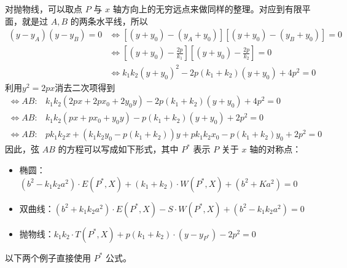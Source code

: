 对抛物线，可以取点 $P$ 与 $x$ 轴方向上的无穷远点来做同样的整理。对应到有限平面，就是过 $A,B$ 的两条水平线，所以
\begin{align*}
(y-y_A)(y-y_B)=0&\Leftrightarrow \left[  (y + y_0) - (y_A + y_0) \right] \left[ (y + y_0) - (y_B + y_0)\right] = 0\\
&\Leftrightarrow \left[  (y + y_0) - \frac{2p}{k_1} \right] \left[ (y + y_0) - \frac{2p}{k_2}\right] = 0\\
&\Leftrightarrow k_1k_2(y + y_0)^2 - 2p(k_1+k_2)(y + y_0) + 4p^2 = 0
\end{align*}
利用$y^2=2px$消去二次项得到
\begin{align*}
\Longleftrightarrow AB:&k_1k_2\left(2px+2px_0+2y_0y\right)-2p(k_1+k_2)(y+y_0)+4p^2=0\\
\Longleftrightarrow AB:&k_1k_2\left(px+px_0+y_0y\right)-p(k_1+k_2)(y+y_0)+2p^2=0\\
\Longleftrightarrow AB:&p k_1k_2 x + \left( k_1k_2 y_0 - p(k_1+k_2) \right) y + p k_1k_2 x_0 - p(k_1+k_2) y_0 + 2p^2 = 0
\end{align*}
因此，弦 $AB$ 的方程可以写成如下形式，其中 $P^*$ 表示 $P$ 关于 $x$ 轴的对称点：
\begin{itemize}
    \item 椭圆：$ (b^2 - k_1k_2 a^2) \cdot E(P^*, X) + (k_1+k_2) \cdot W(P^*, X) + (b^2 + K a^2) = 0$
    \item 双曲线：$(b^2 + k_1k_2 a^2) \cdot E(P^*, X) - S \cdot W(P^*, X) + (b^2 - k_1k_2 a^2) = 0$
    \item 抛物线：$ k_1k_2 \cdot T(P^*, X) + p (k_1+k_2) \cdot (y - y_{P^*}) - 2p^2 = 0 $
\end{itemize}
以下两个例子直接使用 $P^*$ 公式。

